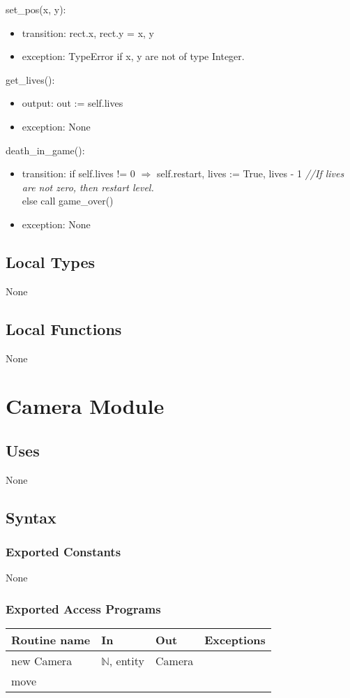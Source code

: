 \documentclass[12pt]{article}
\begin{document}
set\_pos(x, y):
\begin{itemize}
    \item transition: rect.x, rect.y = x, y
    \item exception: TypeError if x, y are not of type Integer.
\end{itemize}

get\_lives():
\begin{itemize}
    \item output: out := self.lives
    \item exception: None
\end{itemize}

death\_in\_game():
\begin{itemize}
    \item transition: if self.lives != 0 $\Rightarrow$ self.restart, lives := True, lives - 1 \emph{//If lives are not zero, then restart level.}\\
    else call game\_over()
    \item exception: None
\end{itemize}


\subsection* {Local Types}

None

\subsection* {Local Functions}

None

\newpage

\section*{Camera Module}
\subsection*{Uses}
None
\subsection*{Syntax}
\subsubsection*{Exported Constants}
None
\subsubsection*{Exported Access Programs}
\begin{tabular}{| l | l | l | p{5cm} |}
\hline
\textbf{Routine name} & \textbf{In} & \textbf{Out} & \textbf{Exceptions}\\
\hline
new Camera & $\mathbb{N}$, entity & Camera & \\
\hline
move & & &\\
\hline
\end{tabular}
\end{document}
